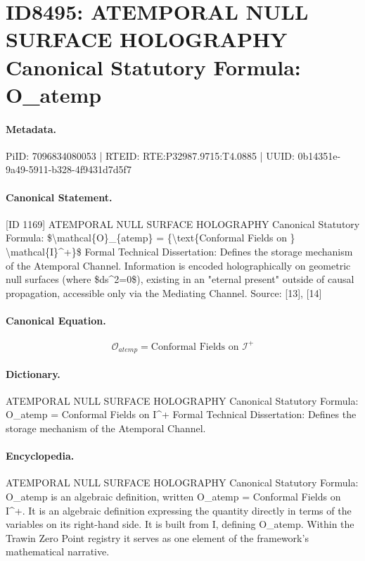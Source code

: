 \section*{ID8495: ATEMPORAL NULL SURFACE HOLOGRAPHY Canonical Statutory Formula: O\_atemp}
\paragraph{Metadata.}
PiID: 7096834080053 | RTEID: RTE:P32987.9715:T4.0885 | UUID: 0b14351e-9a49-5911-b328-4f9431d7d5f7

\paragraph{Canonical Statement.}
[ID 1169] ATEMPORAL NULL SURFACE HOLOGRAPHY Canonical Statutory Formula: \$\textbackslash{}mathcal\{O\}\_\{atemp\} = \{\textbackslash{}text\{Conformal Fields on \} \textbackslash{}mathcal\{I\}\textasciicircum{}+\}\$ Formal Technical Dissertation: Defines the storage mechanism of the Atemporal Channel. Information is encoded holographically on geometric null surfaces (where \$ds\textasciicircum{}2=0\$), existing in an "eternal present" outside of causal propagation, accessible only via the Mediating Channel. Source: [13], [14]

\paragraph{Canonical Equation.}
\[
\mathcal{O}_{atemp} = {\text{Conformal Fields on } \mathcal{I}^+}
\]

\paragraph{Dictionary.}
ATEMPORAL NULL SURFACE HOLOGRAPHY Canonical Statutory Formula: O\_atemp = Conformal Fields on I\textasciicircum{}+ Formal Technical Dissertation: Defines the storage mechanism of the Atemporal Channel.

\paragraph{Encyclopedia.}
ATEMPORAL NULL SURFACE HOLOGRAPHY Canonical Statutory Formula: O\_atemp is an algebraic definition, written O\_atemp = Conformal Fields on I\textasciicircum{}+. It is an algebraic definition expressing the quantity directly in terms of the variables on its right-hand side. It is built from I, defining O\_atemp. Within the Trawin Zero Point registry it serves as one element of the framework's mathematical narrative.
